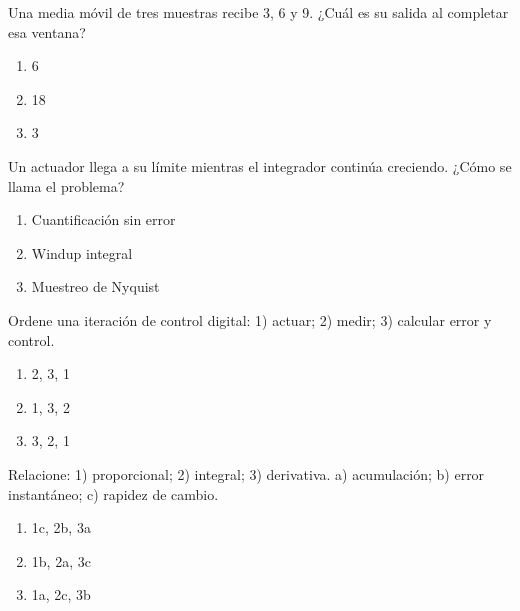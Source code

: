 \noindent\begin{minipage}{\linewidth}\setlength{\parskip}{4pt}\label{q:H-090}
Una media móvil de tres muestras recibe 3, 6 y 9. ¿Cuál es su salida al completar esa ventana?
\begin{enumerate}[label=\Alph*),nosep]
\item 6
\item 18
\item 3
\end{enumerate}\end{minipage}\par\medskip

\noindent\begin{minipage}{\linewidth}\setlength{\parskip}{4pt}\label{q:H-091}
Un actuador llega a su límite mientras el integrador continúa creciendo. ¿Cómo se llama el problema?
\begin{enumerate}[label=\Alph*),nosep]
\item Cuantificación sin error
\item Windup integral
\item Muestreo de Nyquist
\end{enumerate}\end{minipage}\par\medskip

\noindent\begin{minipage}{\linewidth}\setlength{\parskip}{4pt}\label{q:H-092}
Ordene una iteración de control digital: 1) actuar; 2) medir; 3) calcular error y control.
\begin{enumerate}[label=\Alph*),nosep]
\item 2, 3, 1
\item 1, 3, 2
\item 3, 2, 1
\end{enumerate}\end{minipage}\par\medskip

\noindent\begin{minipage}{\linewidth}\setlength{\parskip}{4pt}\label{q:H-093}
Relacione: 1) proporcional; 2) integral; 3) derivativa. a) acumulación; b) error instantáneo; c) rapidez de cambio.
\begin{enumerate}[label=\Alph*),nosep]
\item 1c, 2b, 3a
\item 1b, 2a, 3c
\item 1a, 2c, 3b
\end{enumerate}\end{minipage}\par\medskip

